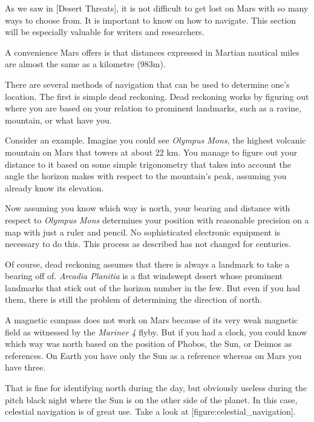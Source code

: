 

As we saw in [Desert Threats], it is not difficult to get lost on Mars with so many ways to choose from. It is important to know on how to navigate. This section will be especially valuable for writers and researchers.

A convenience Mars offers is that distances expressed in Martian nautical miles are almost the same as a kilometre (983m).

There are several methods of navigation that can be used to determine one's location. The first is simple dead reckoning. Dead reckoning works by figuring out where you are based on your relation to prominent landmarks, such as a ravine, mountain, or what have you. 

Consider an example. Imagine you could see {\it Olympus Mons}, the highest volcanic mountain on Mars that towers at about 22 km. You manage to figure out your distance to it based on some simple trigonometry that takes into account the angle the horizon makes with respect to the mountain's peak, assuming you already know its elevation. 

Now assuming you know which way is north, your bearing and distance with respect to {\it Olympus Mons} determines your position with reasonable precision on a map with just a ruler and pencil. No sophisticated electronic equipment is necessary to do this. This process as described has not changed for centuries.

Of course, dead reckoning assumes that there is always a landmark to take a bearing off of. {\it Arcadia Planitia} is a flat windswept desert whose prominent landmarks that stick out of the horizon number in the few. But even if you had them, there is still the problem of determining the direction of north. 

A magnetic compass does not work on Mars because of its very weak magnetic field as witnessed by the {\it Mariner 4} flyby. But if you had a clock, you could know which way was north based on the position of Phobos, the Sun, or Deimos as references. On Earth you have only the Sun as a reference whereas on Mars you have three.

That is fine for identifying north during the day, but obviously useless during the pitch black night where the Sun is on the other side of the planet. In this case, celestial navigation is of great use. Take a look at [figure:celestial_navigation].

